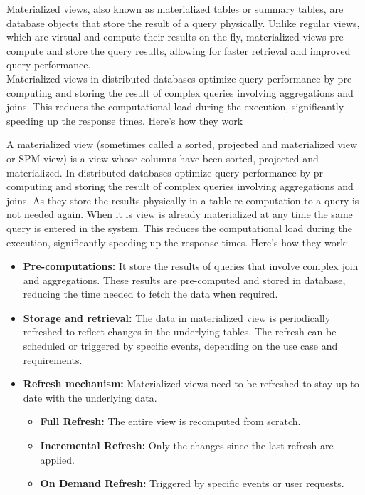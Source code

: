 \begin{definition}
Materialized views, also known as materialized tables or summary tables, are database objects that store the result of a query physically. Unlike regular views, which are virtual and compute their results on the fly, materialized views pre-compute and store the query results, allowing for faster retrieval and improved query performance.\\
Materialized views in distributed databases optimize query performance by pre-computing and storing the result of complex queries involving aggregations and joins. This reduces the computational load during the execution, significantly speeding up the response times. Here’s how they work
\end{definition}

A materialized view (sometimes called a sorted, projected and materialized view or SPM view) is a view whose columns have been sorted, projected and materialized.\cite{IBM} In distributed databases optimize query performance by pr-computing and storing the result of complex queries involving aggregations and joins. As they store the results physically in a table re-computation to a query is not needed again. When it is view is already materialized at any time the same query is entered in the system. This reduces the computational load during the execution, significantly speeding up the response times. Here's how they work:
\begin{itemize}
    \item\textbf{Pre-computations:} It store the results of queries that involve complex join and aggregations. These results are pre-computed and stored in database, reducing the time needed to fetch the data when required.
    \item\textbf{Storage and retrieval:} The data in materialized view is periodically refreshed to reflect changes in the underlying tables. The refresh can be scheduled or triggered by specific events, depending on the use case and requirements.
    \item\textbf{Refresh mechanism:}  Materialized views need to be refreshed to stay up to date with the underlying data.
    \begin{itemize}
        \item\textbf{Full Refresh:} The entire view is recomputed from scratch.
        \item\textbf{Incremental Refresh:} Only the changes since the last refresh are applied.
        \item\textbf{On Demand Refresh:} Triggered by specific events or user requests.
    \end{itemize}
\end{itemize}
